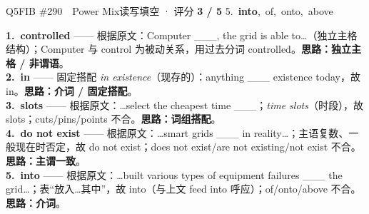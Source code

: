 \begin{qblock}{Q5\quad FIB \#290\ \ Power Mix}{读写填空 · 评分 \textcolor{cAccent}{\bfseries 3 / 5}}
{5.\ \textbf{into},\ of,\ onto,\ above}
\begin{notebox}\footnotesize
\textbf{1.\ controlled} —— 根据原文：Computer \_\_\_, the grid is able to…（独立主格结构）；Computer 与 control 为被动关系，用过去分词 controlled。\textbf{思路：独立主格 / 非谓语}。\\[2pt]
\textbf{2.\ in} —— 固定搭配 \emph{in existence}（现存的）：anything \_\_\_ existence today，故 in。\textbf{思路：介词 / 固定搭配}。\\[2pt]
\textbf{3.\ slots} —— 根据原文：…select the cheapest time \_\_\_；\emph{time slots}（时段），故 slots；cuts/pins/points 不合。\textbf{思路：词组搭配}。\\[2pt]
\textbf{4.\ do not exist} —— 根据原文：…smart grids \_\_\_ in reality…；主语复数、一般现在时否定，故 do not exist；does not exist/are not existing/not exist 不合。\textbf{思路：主谓一致}。\\[2pt]
\textbf{5.\ into} —— 根据原文：…built various types of equipment failures \_\_\_ the grid…；表“放入…其中”，故 into（与上文 feed into 呼应）；of/onto/above 不合。\textbf{思路：介词}。
\end{notebox}
\end{qblock}

